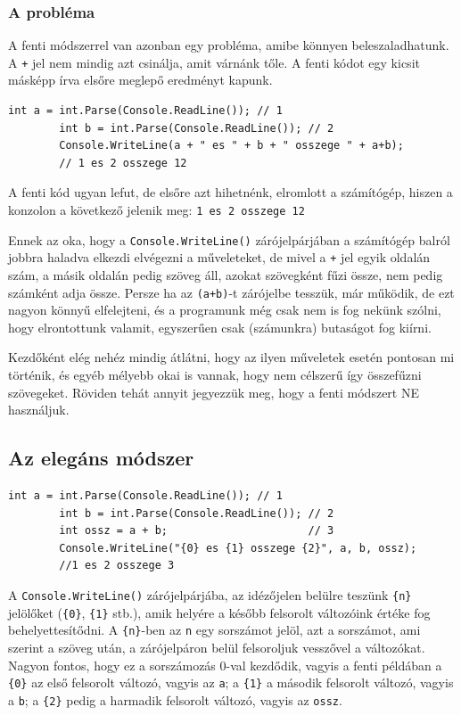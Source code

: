 \documentclass[a4paper]{article}
\begin{document}
	\subsubsection{A probléma}
	A fenti módszerrel van azonban egy probléma, amibe könnyen beleszaladhatunk. A \lstinline{+} jel nem mindig azt csinálja, amit várnánk tőle. A fenti kódot egy kicsit másképp írva elsőre meglepő eredményt kapunk.
	
	\begin{lstlisting}[caption=Változók értékének kiírása -- hibásan, label=lst:writeVarsError]
		int a = int.Parse(Console.ReadLine()); // 1
		int b = int.Parse(Console.ReadLine()); // 2
		Console.WriteLine(a + " es " + b + " osszege " + a+b);
		// 1 es 2 osszege 12
	\end{lstlisting}
	
	A fenti kód ugyan lefut, de elsőre azt hihetnénk, elromlott a számítógép, hiszen a konzolon a következő jelenik meg: \lstinline{1 es 2 osszege 12}
	
	Ennek az oka, hogy a \lstinline{Console.WriteLine()} zárójelpárjában a számítógép balról jobbra haladva elkezdi elvégezni a műveleteket, de mivel a \lstinline{+} jel egyik oldalán szám, a másik oldalán pedig szöveg áll, azokat szövegként fűzi össze, nem pedig számként adja össze. Persze ha az \lstinline{(a+b)}-t zárójelbe tesszük, már működik, de ezt nagyon könnyű elfelejteni, és a programunk még csak nem is fog nekünk szólni, hogy elrontottunk valamit, egyszerűen csak (számunkra) butaságot fog kiírni.
	
	Kezdőként elég nehéz mindig átlátni, hogy az ilyen műveletek esetén pontosan mi történik, és egyéb mélyebb okai is vannak, hogy nem célszerű így összefűzni szövegeket. Röviden tehát annyit jegyezzük meg, hogy a fenti módszert NE használjuk.
	
	\subsection{Az elegáns módszer}
	\begin{lstlisting}[caption=Változók értékének kiírása -- elegánsan, label=lst:writeVarsElegant]
		int a = int.Parse(Console.ReadLine()); // 1
		int b = int.Parse(Console.ReadLine()); // 2
		int ossz = a + b;                      // 3
		Console.WriteLine("{0} es {1} osszege {2}", a, b, ossz);
		//1 es 2 osszege 3
	\end{lstlisting}
	
	A \lstinline{Console.WriteLine()} zárójelpárjába, az idézőjelen belülre teszünk \lstinline!{n}! jelölőket (\lstinline!{0}!, \lstinline!{1}! stb.), amik helyére a később felsorolt változóink értéke fog behelyettesítődni. A \lstinline!{n}!-ben az \lstinline{n} egy sorszámot jelöl, azt a sorszámot, ami szerint a szöveg után, a zárójelpáron belül felsoroljuk vesszővel a változókat. Nagyon fontos, hogy ez a sorszámozás 0-val kezdődik, vagyis a fenti példában a \lstinline!{0}! az első felsorolt változó, vagyis az \lstinline{a}; a \lstinline!{1}! a második felsorolt változó, vagyis a \lstinline{b}; a \lstinline!{2}! pedig a harmadik felsorolt változó, vagyis az \lstinline{ossz}.
	
\end{document}
